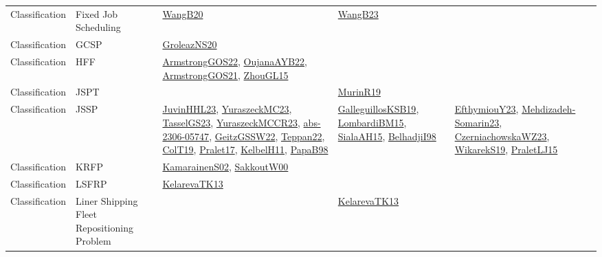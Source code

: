 {\begin{longtable}{lp{3cm}>{\raggedright}p{6cm}>{\raggedright}p{6cm}p{8cm}}
Classification & Fixed Job Scheduling & \href{papers/WangB20.pdf}{WangB20}\cite{WangB20} & \href{papers/WangB23.pdf}{WangB23}\cite{WangB23} & \\
Classification & GCSP & \href{papers/GroleazNS20.pdf}{GroleazNS20}\cite{GroleazNS20} &  & \\
Classification & HFF & \href{papers/ArmstrongGOS22.pdf}{ArmstrongGOS22}\cite{ArmstrongGOS22}, \href{papers/OujanaAYB22.pdf}{OujanaAYB22}\cite{OujanaAYB22}, \href{papers/ArmstrongGOS21.pdf}{ArmstrongGOS21}\cite{ArmstrongGOS21}, \href{papers/ZhouGL15.pdf}{ZhouGL15}\cite{ZhouGL15} &  & \\
Classification & JSPT &  & \href{papers/MurinR19.pdf}{MurinR19}\cite{MurinR19} & \\
Classification & JSSP & \href{papers/JuvinHHL23.pdf}{JuvinHHL23}\cite{JuvinHHL23}, \href{papers/YuraszeckMC23.pdf}{YuraszeckMC23}\cite{YuraszeckMC23}, \href{papers/TasselGS23.pdf}{TasselGS23}\cite{TasselGS23}, \href{articles/YuraszeckMCCR23.pdf}{YuraszeckMCCR23}\cite{YuraszeckMCCR23}, \href{articles/abs-2306-05747.pdf}{abs-2306-05747}\cite{abs-2306-05747}, \href{papers/GeitzGSSW22.pdf}{GeitzGSSW22}\cite{GeitzGSSW22}, \href{papers/Teppan22.pdf}{Teppan22}\cite{Teppan22}, \href{papers/ColT19.pdf}{ColT19}\cite{ColT19}, \href{papers/Pralet17.pdf}{Pralet17}\cite{Pralet17}, \href{articles/KelbelH11.pdf}{KelbelH11}\cite{KelbelH11}, \href{articles/PapaB98.pdf}{PapaB98}\cite{PapaB98} & \href{papers/GalleguillosKSB19.pdf}{GalleguillosKSB19}\cite{GalleguillosKSB19}, \href{papers/LombardiBM15.pdf}{LombardiBM15}\cite{LombardiBM15}, \href{papers/SialaAH15.pdf}{SialaAH15}\cite{SialaAH15}, \href{articles/BelhadjiI98.pdf}{BelhadjiI98}\cite{BelhadjiI98} & \href{papers/EfthymiouY23.pdf}{EfthymiouY23}\cite{EfthymiouY23}, \href{papers/Mehdizadeh-Somarin23.pdf}{Mehdizadeh-Somarin23}\cite{Mehdizadeh-Somarin23}, \href{articles/CzerniachowskaWZ23.pdf}{CzerniachowskaWZ23}\cite{CzerniachowskaWZ23}, \href{articles/WikarekS19.pdf}{WikarekS19}\cite{WikarekS19}, \href{papers/PraletLJ15.pdf}{PraletLJ15}\cite{PraletLJ15}\\
Classification & KRFP & \href{papers/KamarainenS02.pdf}{KamarainenS02}\cite{KamarainenS02}, \href{articles/SakkoutW00.pdf}{SakkoutW00}\cite{SakkoutW00} &  & \\
Classification & LSFRP & \href{papers/KelarevaTK13.pdf}{KelarevaTK13}\cite{KelarevaTK13} &  & \\
Classification & Liner Shipping Fleet Repositioning Problem &  & \href{papers/KelarevaTK13.pdf}{KelarevaTK13}\cite{KelarevaTK13} & \\

\end{longtable}}
